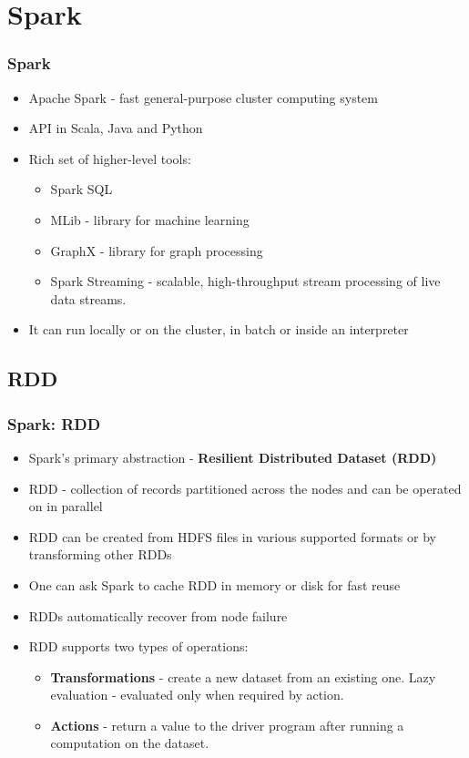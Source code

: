 \documentclass{beamer}
\begin{document}
\section{Spark}
\begin{frame}
 \frametitle{Spark}
 \begin{itemize}
  \item Apache Spark - fast general-purpose cluster computing system
  \item API in Scala, Java and Python
  \item Rich set of higher-level tools:
    \begin{itemize}
      \item Spark SQL
      \item MLib - library for machine learning
      \item GraphX - library for graph processing
      \item Spark Streaming - scalable, high-throughput stream processing of live data streams.
    \end{itemize}
  \item It can run locally or on the cluster, in batch or inside an interpreter
 \end{itemize}
\end{frame}

\subsection{RDD}
\begin{frame}
 \frametitle{Spark: RDD}
 \begin{itemize}
  \item Spark's primary abstraction - {\color{mycolordef}\textbf{Resilient Distributed Dataset (RDD)}}
  \item RDD - collection of records partitioned across the nodes and can be operated on in parallel
  \item RDD can be created from HDFS files in various supported formats or by transforming other RDDs
  \item One can ask Spark to {\color{mycolordef}cache RDD in memory or disk} for fast reuse
  \item RDDs automatically recover from node failure
  \item RDD supports two types of operations:
    \begin{itemize}
      \item {\color{mycolordef}\textbf{Transformations}} - create a new dataset from an existing one. Lazy evaluation - evaluated only when required by action.
      \item {\color{mycolordef}\textbf{Actions}} - return a value to the driver program after running a computation on the dataset.
    \end{itemize}
 \end{itemize}
\end{frame}
\end{document}
